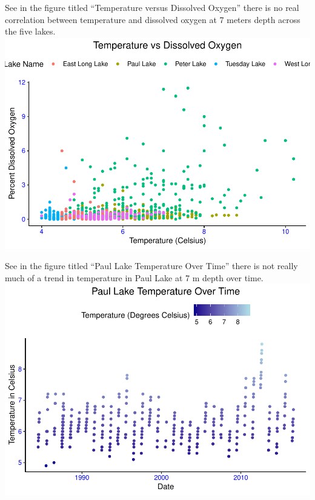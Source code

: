 \documentclass[12pt,]{article}
\begin{document}
See in the figure titled ``Temperature versus Dissolved Oxygen'' there
is no real correlation between temperature and dissolved oxygen at 7
meters depth across the five lakes.
\includegraphics{KeithBollt_ENV872_FinalProject_files/figure-latex/visualization2-1.pdf}

See in the figure titled ``Paul Lake Temperature Over Time'' there is
not really much of a trend in temperature in Paul Lake at 7 m depth over
time.
\includegraphics{KeithBollt_ENV872_FinalProject_files/figure-latex/visualization3-1.pdf}
\end{document}
